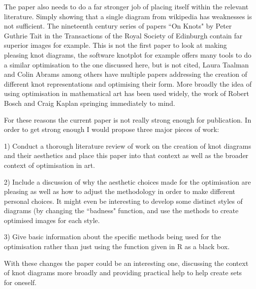 \documentclass[12pt]{article}
\begin{document}
The paper also needs to do a far stronger job of placing itself within
the relevant literature. Simply showing that a single diagram from
wikipedia has weaknesses is not sufficient. The nineteenth century
series of papers ``On Knots" by Peter Guthrie Tait in the Transactions
of the Royal Society of Edinburgh contain far superior images for
example. This is not the first paper to look at making pleasing knot
diagrams, the software knotplot for example offers many tools to do a
similar optimisation to the one discussed here, but is not cited,
Laura Taalman and Colin Abrams among others have multiple papers
addressing the creation of different knot representations and
optimising their form. More broadly the idea of using optimisation in
mathematical art has been used widely, the work of Robert Bosch and
Craig Kaplan springing immediately to mind.

For these reasons the current paper is not really strong enough for
publication. In order to get strong enough I would propose three major
pieces of work:

1) Conduct a thorough literature review of work on the creation of
knot diagrams and their aesthetics and place this paper into that
context as well as the broader context of optimisation in art.

2) Include a discussion of why the aesthetic choices made for the
optimisation are pleasing as well as how to adjust the methodology in
order to make different personal choices. It might even be interesting
to develop some distinct styles of diagrams (by changing the ``badness"
function, and use the methods to create optimised images for each
style.

3) Give basic information about the specific methods being used for
the optimisation rather than just using the function given in R as a
black box.

With these changes the paper could be an interesting one, discussing
the context of knot diagrams more broadly and providing practical help
to help create sets for oneself.
\end{document}
